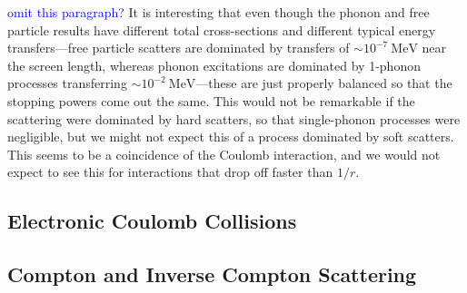 \documentclass[twocolumn,preprintnumbers,amsmath,amssymb,prl, superscriptaddress]{revtex4}
\def\r{\right)}
\def\l{\left(}
\begin{document}
\begin{appendices}
\textcolor{blue}{omit this paragraph?} It is interesting that even though the phonon and free particle results have different total cross-sections and different typical energy transfers---free particle scatters are dominated by transfers of $ \sim 10^{-7}~\text{MeV}$ near the screen length, whereas phonon excitations are dominated by 1-phonon processes transferring $ \sim 10^{-2}~\text{MeV}$---these are just properly balanced so that the stopping powers come out the same. This would not be remarkable if the scattering were dominated by hard scatters, so that single-phonon processes were negligible, but we might not expect this of a process dominated by soft scatters. This seems to be a coincidence of the Coulomb interaction, and we would not expect to see this for interactions that drop off faster than $1 / r$.


\subsection{Electronic Coulomb Collisions}

 \subsection{Compton and Inverse Compton Scattering}


\end{appendices}
\end{document}
